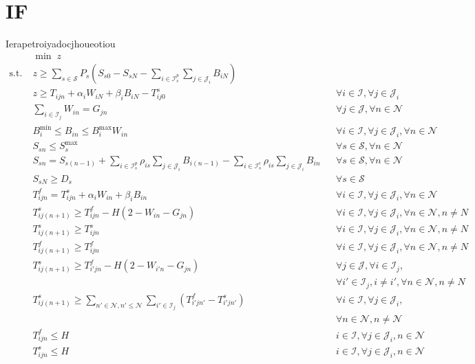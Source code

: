 \section{IF}
Ierapetroiyadocjhoueotiou 
\begin{align}
&\min \; z &&\\
\text{s.t.}\; &z \ge \sum_{s\in \mathcal{S}} P_s (S_{s0} - S_{sN}  -\sum_{i \in \mathcal{I}_{s}^p}\sum_{j \in \mathcal{J}_{i}} B_{iN}) && \\
		     & z \ge T_{ijn} + \alpha_i W_{iN} + \beta_{i} B_{iN} - T_{ij0}^s  && \forall i \in \mathcal{I}, \forall j \in \mathcal{J}_i \\
		     & \sum_{i \in \mathcal{I}_j} W_{in} = G_{jn} && \forall j \in \mathcal{J}, \forall n \in \mathcal{N} \\
		     &B_{i}^{\text{min}} \le B_{in} \le B_{i}^{\text{max}} W_{in} && \forall i \in \mathcal{I}, \forall j \in \mathcal{J}_i, \forall n \in \mathcal{N} \\
		     & S_{sn} \le S_{s}^{\text{max}} && \forall s \in \mathcal{S}, \forall n \in \mathcal{N} \\
		     & S_{sn} = S_{s(n-1)} + \sum_{i \in \mathcal{I}_{s}^p} \rho_{is} \sum_{j \in \mathcal{J}_{i}} B_{i(n-1)} - \sum_{i \in \mathcal{I}_{s}^c} \rho_{is} \sum_{j \in \mathcal{J}_{i}} B_{in}  &&\forall s \in \mathcal{S}, \forall n \in \mathcal{N} \\
		     & S_{sN} \ge D_s && \forall s \in \mathcal{S} \\
		     & T_{ijn}^f = T_{ijn}^s + \alpha_i W_{in} + \beta_i B_{in} && \forall i \in \mathcal{I}, \forall j \in \mathcal{J}_i, \forall n \in \mathcal{N} \\
		     & T_{ij(n+1)}^s \ge T_{ijn}^f - H (2 - W_{in} - G_{jn}) && \forall i \in \mathcal{I}, \forall j \in \mathcal{J}_i, \forall n \in \mathcal{N}, n \ne N \\
		     & T_{ij(n+1)}^s \ge T_{ijn}^s && \forall i \in \mathcal{I}, \forall j \in \mathcal{J}_i, \forall n \in \mathcal{N}, n \ne N \\
		     & T_{ij(n+1)}^f \ge T_{ijn}^f && \forall i \in \mathcal{I}, \forall j \in \mathcal{J}_i, \forall n \in \mathcal{N}, n \ne N \\
		     & T_{ij(n+1)}^s \ge T_{i'jn}^f - H (2 - W_{i'n} - G_{jn}) && \forall j \in \mathcal{J}, \forall i \in \mathcal{I}_j, \\
		     & &&\forall i' \in \mathcal{I}_j, i \ne i', \forall n \in \mathcal{N}, n \ne N \nonumber \\
		     & T_{ij(n+1)}^s \ge \sum_{n' \in \mathcal{N}, n' \le \mathcal{N}} \sum_{i' \in \mathcal{I}_j} (T_{i'jn'}^f - T_{i'jn'}^s) &&\forall i \in \mathcal{I}, \forall j \in \mathcal{J}_i, \\ 
		     & &&\forall n \in \mathcal{N}, n \ne \mathcal{N} \nonumber \\
		     & T_{ijn}^f \le H && i \in \mathcal{I}, \forall j \in \mathcal{J}_i, n \in \mathcal{N} \\
		     & T_{ijn}^s \le H &&  i \in \mathcal{I}, \forall j \in \mathcal{J}_i, n \in \mathcal{N}
\end{align}

